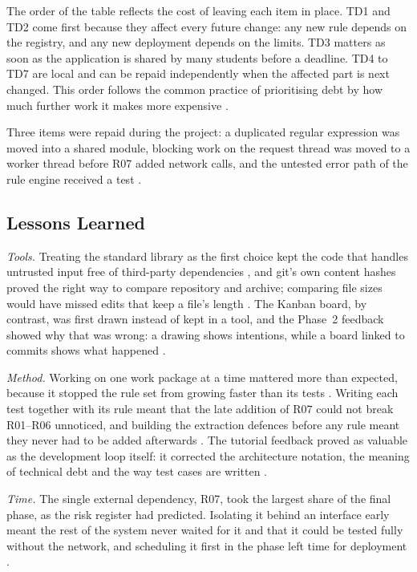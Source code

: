 \documentclass[a4paper,11pt]{article}
\begin{document}
The order of the table reflects the cost of leaving each item in place. TD1 and
TD2 come first because they affect every future change: any new rule depends on
the registry, and any new deployment depends on the limits. TD3 matters as soon
as the application is shared by many students before a deadline. TD4 to TD7 are
local and can be repaid independently when the affected part is next changed. This
order follows the common practice of prioritising debt by how much further work
it makes more expensive \citep{Lenarduzzi2021}.

Three items were repaid during the project: a duplicated regular expression was
moved into a shared module, blocking work on the request thread was moved to a
worker thread before R07 added network calls, and the untested error path of the
rule engine received a test \citep{Winters2020}.

\subsection{Lessons Learned}\label{sec:lessons}

\textit{Tools.} Treating the standard library as the first choice kept the code
that handles untrusted input free of third-party dependencies
\citep{PSF2025}, and git's own content hashes proved the right way to compare
repository and archive; comparing file sizes would have missed edits that keep a
file's length \citep{Chacon2024}. The Kanban board, by contrast, was first drawn
instead of kept in a tool, and the Phase~2 feedback showed why that was wrong: a
drawing shows intentions, while a board linked to commits shows what happened
\citep{GitHubProjects2025}.

\textit{Method.} Working on one work package at a time mattered more than
expected, because it stopped the rule set from growing faster than its tests
\citep{Ambler2022}. Writing each test together with its rule meant that the late
addition of R07 could not break R01--R06 unnoticed, and building the extraction
defences before any rule meant they never had to be added afterwards
\citep{Khorikov2020}. The tutorial feedback proved as valuable as the
development loop itself: it corrected the architecture notation, the meaning of
technical debt and the way test cases are written \citep{Schwaber2020}.

\textit{Time.} The single external dependency, R07, took the largest share of the
final phase, as the risk register had predicted. Isolating it behind an interface
early meant the rest of the system never waited for it and that it could be
tested fully without the network, and scheduling it first in the phase left time
for deployment \citep{Sommerville2020}.
\end{document}
